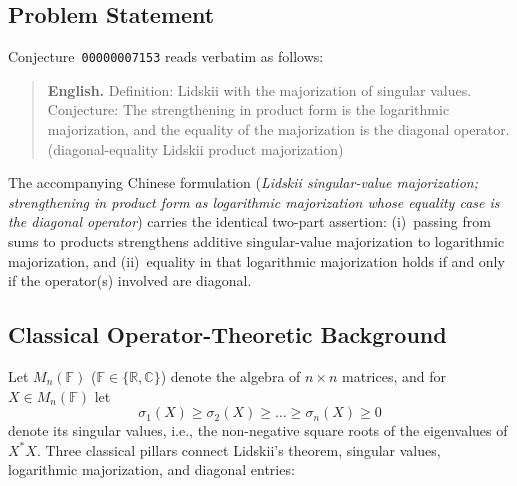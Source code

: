 \documentclass[11pt,a4paper]{article}
\theoremstyle{definition}
\newcommand{\R}{\mathbb{R}}
\newcommand{\C}{\mathbb{C}}
\begin{document}
\subsection{Problem Statement}

Conjecture~\texttt{00000007153} reads verbatim as follows:

\begin{quote}
\textbf{English.} Definition: Lidskii with the majorization of singular values. Conjecture: The strengthening in product form is the logarithmic majorization, and the equality of the majorization is the diagonal operator. (diagonal-equality Lidskii product majorization)
\end{quote}

The accompanying Chinese formulation (\emph{Lidskii singular-value majorization; strengthening in product form as logarithmic majorization whose equality case is the diagonal operator}) carries the identical two-part assertion: (i)~passing from sums to products strengthens additive singular-value majorization to logarithmic majorization, and (ii)~equality in that logarithmic majorization holds if and only if the operator(s) involved are diagonal.

\subsection{Classical Operator-Theoretic Background}

Let $M_n(\mathbb{F})$ ($\mathbb{F} \in \{\R, \C\}$) denote the algebra of $n \times n$ matrices, and for $X \in M_n(\mathbb{F})$ let
\[
  \sigma_1(X) \ge \sigma_2(X) \ge \dots \ge \sigma_n(X) \ge 0
\]
denote its singular values, i.e., the non-negative square roots of the eigenvalues of $X^* X$. Three classical pillars connect Lidskii's theorem, singular values, logarithmic majorization, and diagonal entries:
\end{document}

